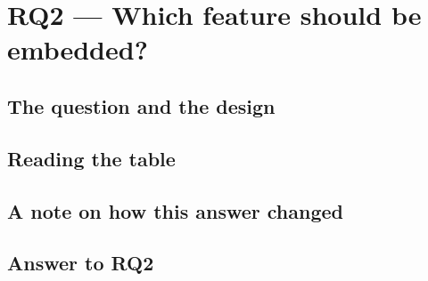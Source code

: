 \section{RQ2 --- Which feature should be embedded?}
\label{sec:rq2}

\subsection{The question and the design}

\subsection{Reading the table}

\subsection{A note on how this answer changed}

\subsection{Answer to RQ2}

